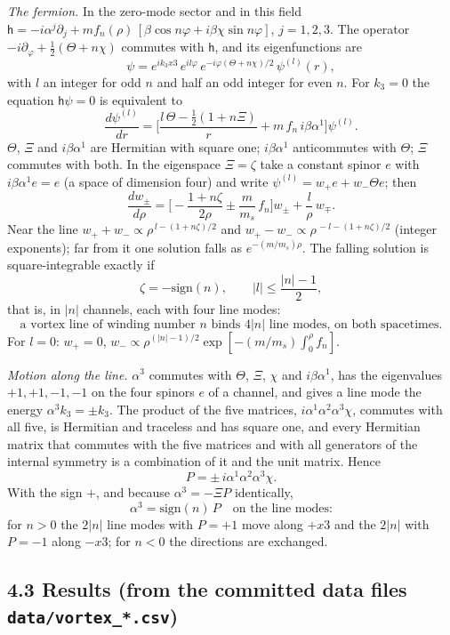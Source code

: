 \documentclass[
  10pt,
]{article}
\begin{document}
\emph{The fermion.} In the zero-mode sector and in this field
\(\mathsf h=-i\alpha^j\partial_j+m f_n(\rho)\,[\beta\cos n\varphi+i\beta\chi\sin n\varphi]\),
\(j=1,2,3\). The operator \(-i\partial_\varphi+\tfrac12(\Theta+n\chi)\)
commutes with \(\mathsf h\), and its eigenfunctions are
\[\psi=e^{ik_3x3}\,e^{il\varphi}\,e^{-i\varphi(\Theta+n\chi)/2}\,\psi^{(l)}(r),\tag{4}\]
with \(l\) an integer for odd \(n\) and half an odd integer for even
\(n\). For \(k_3=0\) the equation \(\mathsf h\psi=0\) is equivalent to
\[\frac{d\psi^{(l)}}{dr}=\Big[\frac{l\,\Theta-\tfrac12(1+n\Xi)}{r}+m\,f_n\,i\beta\alpha^1\Big]\psi^{(l)}.\tag{5}\]
\(\Theta\), \(\Xi\) and \(i\beta\alpha^1\) are Hermitian with square
one; \(i\beta\alpha^1\) anticommutes with \(\Theta\); \(\Xi\) commutes
with both. In the eigenspace \(\Xi=\zeta\) take a constant spinor \(e\)
with \(i\beta\alpha^1e=e\) (a space of dimension four) and write
\(\psi^{(l)}=w_+e+w_-\Theta e\); then
\[\frac{dw_\pm}{d\rho}=\Big[-\frac{1+n\zeta}{2\rho}\pm\frac{m}{m_s}\,f_n\Big]w_\pm+\frac{l}{\rho}\,w_\mp .\tag{6}\]
Near the line \(w_++w_-\propto\rho^{\,l-(1+n\zeta)/2}\) and
\(w_+-w_-\propto\rho^{\,-l-(1+n\zeta)/2}\) (integer exponents); far from
it one solution falls as \(e^{-(m/m_s)\rho}\). The falling solution is
square-integrable exactly if
\[\zeta=-\mathrm{sign}(n),\qquad |l|\le\frac{|n|-1}{2},\tag{7}\] that
is, in \(|n|\) channels, each with four line modes:
\[\text{a vortex line of winding number } n \text{ binds } 4|n| \text{ line modes, on both spacetimes.}\tag{8}\]
For \(l=0\): \(w_+=0\),
\(w_-\propto\rho^{(|n|-1)/2}\exp[-(m/m_s)\int_0^\rho f_n]\).

\emph{Motion along the line.} \(\alpha^3\) commutes with \(\Theta\),
\(\Xi\), \(\chi\) and \(i\beta\alpha^1\), has the eigenvalues
\(+1,+1,-1,-1\) on the four spinors \(e\) of a channel, and gives a line
mode the energy \(\alpha^3k_3=\pm k_3\). The product of the five
matrices, \(i\alpha^1\alpha^2\alpha^3\chi\), commutes with all five, is
Hermitian and traceless and has square one, and every Hermitian matrix
that commutes with the five matrices and with all generators of the
internal symmetry is a combination of it and the unit matrix. Hence
\[P=\pm\,i\alpha^1\alpha^2\alpha^3\chi .\tag{9}\] With the sign \(+\),
and because \(\alpha^3=-\Xi P\) identically,
\[\alpha^3=\mathrm{sign}(n)\,P\quad\text{on the line modes:}\tag{10}\]
for \(n>0\) the \(2|n|\) line modes with \(P=+1\) move along \(+x3\) and
the \(2|n|\) with \(P=-1\) along \(-x3\); for \(n<0\) the directions are
exchanged.

\hypertarget{results-from-the-committed-data-files-datavortex_.csv}{%
\subsection{\texorpdfstring{4.3 Results (from the committed data files
\texttt{data/vortex\_*.csv})}{4.3 Results (from the committed data files data/vortex\_*.csv)}}\label{results-from-the-committed-data-files-datavortex_.csv}}
\end{document}
